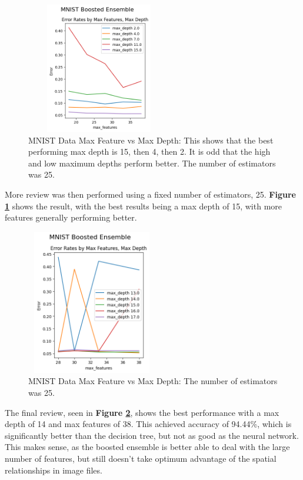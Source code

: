 \documentclass[letterpaper]{article} %
\begin{document}
\begin{figure}[h]
\centering
\includegraphics[width=2.5in, height=2.25in]{figures/MNIST_Boosted_Ensemble_boosting_2.png}
\caption{MNIST Data Max Feature vs Max Depth:  This shows that the best performing max depth is 15, then 4, then 2.  It is odd that the high and low maximum depths perform better. The number of estimators was 25.  }
\label{fig:boosting_mnist_2}
\end{figure}

More review was then performed using a fixed number of estimators, 25. \textbf{Figure \ref{fig:boosting_mnist_2}} shows the result, with the best results being a max depth of 15, with more features generally performing better.

\begin{figure}[h]
\centering
\includegraphics[width=2.25in, height=2.5in]{figures/MNIST_Boosted_Ensemble_boosting_3.png}
\caption{MNIST Data Max Feature vs Max Depth:  The number of estimators was 25.  }
\label{fig:boosting_mnist_3}
\end{figure}

The final review, seen in \textbf{Figure \ref{fig:boosting_mnist_3}}, shows the best performance with a max depth of 14 and max features of 38.  This achieved accuracy of 94.44\%, which is significantly better than the decision tree, but not as good as the neural network.  This makes sense, as the boosted ensemble is better able to deal with the large number of features, but still doesn't take optimum advantage of the spatial relationships in image files.
\end{document}
